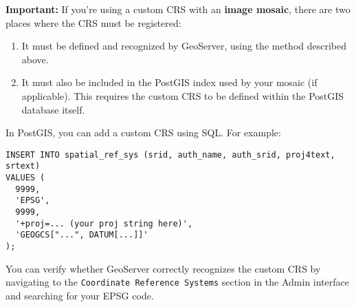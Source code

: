 \documentclass{article}
\begin{document}
\textbf{Important:} If you're using a custom CRS with an \textbf{image mosaic}, there are two places where the CRS must be registered:

\begin{enumerate}
  \item It must be defined and recognized by GeoServer, using the method described above.
  \item It must also be included in the PostGIS index used by your mosaic (if applicable). This requires the custom CRS to be defined within the PostGIS database itself.
\end{enumerate}

In PostGIS, you can add a custom CRS using SQL. For example:

\begin{verbatim}
INSERT INTO spatial_ref_sys (srid, auth_name, auth_srid, proj4text, srtext)
VALUES (
  9999,
  'EPSG',
  9999,
  '+proj=... (your proj string here)',
  'GEOGCS["...", DATUM[...]]'
);
\end{verbatim}

You can verify whether GeoServer correctly recognizes the custom CRS by navigating to the \texttt{Coordinate Reference Systems} section in the Admin interface and searching for your EPSG code.
\end{document}
